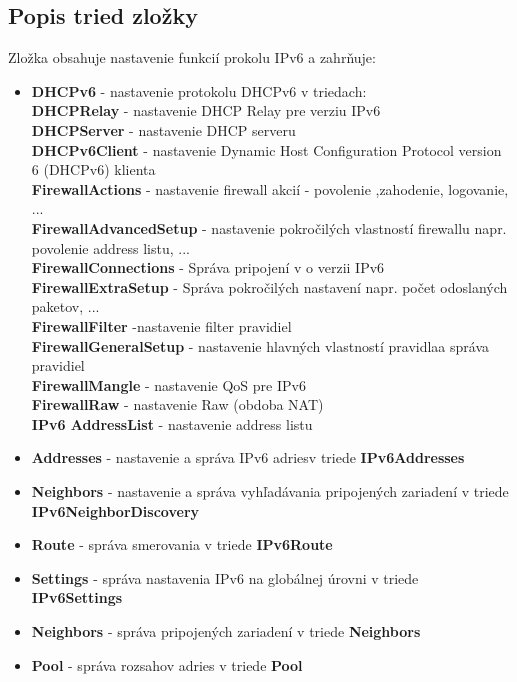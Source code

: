\subsection{Popis tried zložky}
Zložka obsahuje nastavenie funkcií prokolu IPv6 a zahrňuje:\begin{itemize}
\item \textbf{DHCPv6} - nastavenie protokolu DHCPv6 v triedach:\\
\textbf{DHCPRelay} - nastavenie DHCP Relay pre verziu IPv6\\
\textbf{DHCPServer} - nastavenie DHCP serveru\\
\textbf{DHCPv6Client} - nastavenie Dynamic Host Configuration Protocol  version 6 (DHCPv6) klienta\\
\textbf{FirewallActions} - nastavenie firewall akcií - povolenie ,zahodenie, logovanie, ...\\
\textbf{FirewallAdvancedSetup} - nastavenie pokročilých vlastností firewallu napr. povolenie address listu, ...\\
\textbf{FirewallConnections} - Správa pripojení v o verzii IPv6\\
\textbf{FirewallExtraSetup} - Správa pokročilých nastavení napr. počet odoslaných paketov, ...\\
\textbf{FirewallFilter} -nastavenie filter pravidiel \\
\textbf{FirewallGeneralSetup} - nastavenie hlavných vlastností pravidlaa správa pravidiel\\
\textbf{FirewallMangle} - nastavenie QoS pre IPv6\\
\textbf{FirewallRaw} - nastavenie Raw (obdoba NAT)\\
\textbf{IPv6 AddressList}  - nastavenie address listu
\item \textbf{Addresses} - nastavenie a správa IPv6 adriesv triede \textbf{IPv6Addresses}
\item \textbf{Neighbors} - nastavenie a správa vyhľadávania pripojených zariadení v triede \textbf{IPv6NeighborDiscovery}
\item \textbf{Route} - správa smerovania v triede \textbf{IPv6Route}
\item \textbf{Settings} - správa nastavenia IPv6 na globálnej úrovni v triede \textbf{IPv6Settings}
\item \textbf{Neighbors} - správa pripojených zariadení v triede \textbf{Neighbors}
\item \textbf{Pool} - správa rozsahov adries v triede \textbf{Pool}
\end{itemize}
